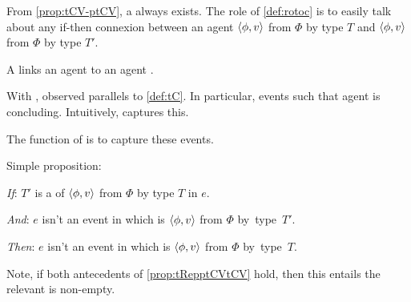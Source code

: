 \begin{note}
  \noindent%
  From \autoref{prop:tCV-ptCV}, a \tRep{} always exists.
  The role of \autoref{def:rotoc} is to easily talk about any if-then connexion between an agent \tCV{} \(\langle \phi, v \rangle\) from \(\Phi\) by type \(T\) and \ptCV{} \(\langle \phi, v \rangle\) from \(\Phi\) by type \(T'\).
\end{note}

\begin{note}
  A \rotoc{} links an agent \ptCV{} to an agent \tCV{}.

  With \ptCV{}, observed parallels to \autoref{def:tC}.
  In particular, events such that agent is concluding.
  Intuitively, \rotoc{} captures this.

  The function of \rotoc{} is to capture these events.
\end{note}

\begin{note}
  Simple proposition:

  \begin{proposition}
    \label{prop:tRepptCVtCV}

    \noindent%
    \begin{itenum}
    \item[\emph{If}:]
      \(T'\) is a \tRep{} of \vAgent{} \tCV{} \(\langle \phi, v \rangle\) from \(\Phi\) by type \(T\) in \(e\).
    \item[\emph{And}:]
      \(e\) isn't an event in which \vAgent{} is  \(\langle \phi, v \rangle\) from \(\Phi\) by~type~\(T'\).
    \item[\emph{Then}:]
      \(e\) isn't an event in which \vAgent{} is  \(\langle \phi, v \rangle\) from \(\Phi\) by~type~\(T\).
    \end{itenum}
    \vspace{-.5\baselineskip}
  \end{proposition}

  \noindent%
  Note, if both antecedents of \autoref{prop:tRepptCVtCV} hold, then this entails the relevant \tRep{} is non-empty.
\end{note}

